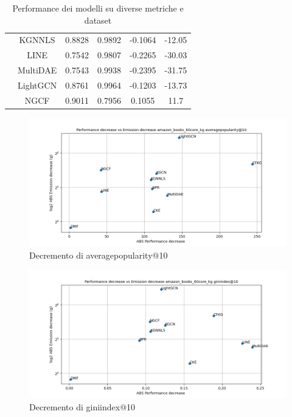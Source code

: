 \begin{table}[H]
{\begin{tabular}{|c|c|c|c|c|c|}
                                        & KGNNLS & 0.8828 & 0.9892 & -0.1064 & -12.05 \\ \cline{2-6} 
                                        & LINE & 0.7542 & 0.9807 & -0.2265 & -30.03 \\ \cline{2-6} 
                                        & MultiDAE & 0.7543 & 0.9938 & -0.2395 & -31.75 \\ \cline{2-6} 
                                        & LightGCN & 0.8761 & 0.9964 & -0.1203 & -13.73 \\ \cline{2-6} 
                                        & NGCF & 0.9011 & 0.7956 & 0.1055 & 11.7 \\ \cline{2-6} 
        \hline
    \end{tabular}
    }
    \caption{Performance dei modelli su diverse metriche e dataset}
\end{table}


\begin{figure}[H]
    \centering
     \includegraphics[width=\textwidth]{images/decrement_averagepopularity@10_amazon_books_60core_kg.png}
    \caption{Decremento di averagepopularity@10}
\end{figure}

\begin{figure}[H]
    \centering
     \includegraphics[width=\textwidth]{images/decrement_giniindex@10_amazon_books_60core_kg.png}
    \caption{Decremento di giniindex@10}
\end{figure}

